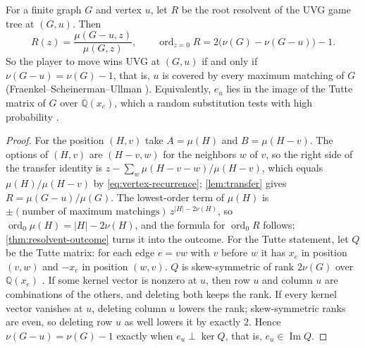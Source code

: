 \documentclass[final]{siamart0516}
\numberwithin{theorem}{section}
\numberwithin{equation}{section}
\theoremstyle{siamnonum}
\theoremstyle{plain}
\newcommand{\QQ}{\mathbb{Q}}
\newcommand{\ord}{\operatorname{ord}}
\begin{document}
\begin{theorem}\label{thm:matching-collapse}
For a finite graph $G$ and vertex $u$, let $R$ be the root resolvent of the UVG game tree at $(G,u)$. Then
\[
R(z)=\frac{\mu(G-u,z)}{\mu(G,z)},\qquad \ord_{z=0}R=2\bigl(\nu(G)-\nu(G-u)\bigr)-1.
\]
So the player to move wins UVG at $(G,u)$ if and only if $\nu(G-u)=\nu(G)-1$, that is, $u$ is covered by every maximum matching of $G$ \textup{(}Fraenkel--Scheinerman--Ullman \cite{FSU}\textup{)}. Equivalently, $e_u$ lies in the image of the Tutte matrix of $G$ over $\QQ(x_e)$, which a random substitution tests with high probability \cite{Lovasz}.
\end{theorem}

\begin{proof}
For the position $(H,v)$ take $A=\mu(H)$ and $B=\mu(H-v)$. The options of $(H,v)$ are $(H-v,w)$ for the neighbors $w$ of $v$, so the right side of the transfer identity is $z-\sum_w\mu(H-v-w)/\mu(H-v)$, which equals $\mu(H)/\mu(H-v)$ by \eqref{eq:vertex-recurrence}; \cref{lem:transfer} gives $R=\mu(G-u)/\mu(G)$. The lowest-order term of $\mu(H)$ is $\pm(\text{number of maximum matchings})\,z^{|H|-2\nu(H)}$, so $\ord_0\mu(H)=|H|-2\nu(H)$, and the formula for $\ord_0R$ follows; \cref{thm:resolvent-outcome} turns it into the outcome.
For the Tutte statement, let $Q$ be the Tutte matrix: for each edge $e=vw$ with $v$ before $w$ it has $x_e$ in position $(v,w)$ and $-x_e$ in position $(w,v)$. $Q$ is skew-symmetric of rank $2\nu(G)$ over $\QQ(x_e)$ \cite{Tutte,Lovasz}. If some kernel vector is nonzero at $u$, then row $u$ and column $u$ are combinations of the others, and deleting both keeps the rank. If every kernel vector vanishes at $u$, deleting column $u$ lowers the rank; skew-symmetric ranks are even, so deleting row $u$ as well lowers it by exactly $2$. Hence $\nu(G-u)=\nu(G)-1$ exactly when $e_u\perp\ker Q$, that is, $e_u\in\operatorname{Im}Q$.
\end{proof}
\end{document}
